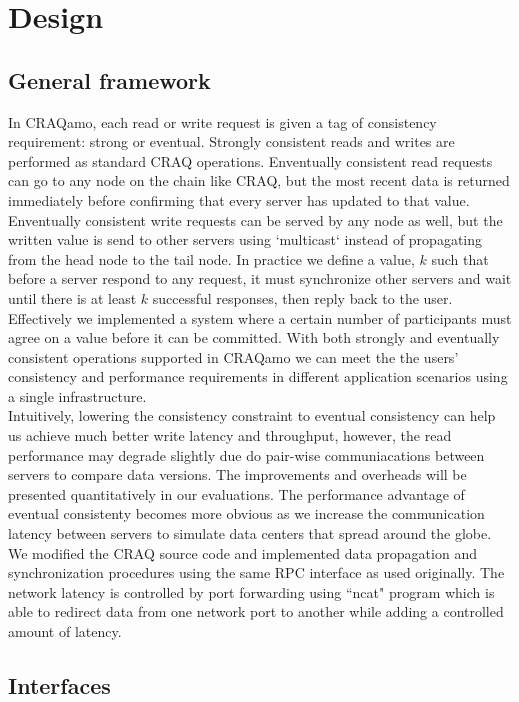 \section{Design}
\label{sec:design}

\subsection{General framework}
In CRAQamo, each read or write request is given a tag of consistency requirement: strong or eventual. Strongly consistent reads and writes are performed as standard CRAQ operations. Enventually consistent read requests can go to any node on the chain like CRAQ, but the most recent data is returned immediately before confirming that every server has updated to that value. Enventually consistent write requests can be served by any node as well, but the written value is send to other servers using `multicast` instead of propagating from the head node to the tail node. In practice we define a value, $k$ such that before a server respond to any request, it must synchronize other servers and wait until there is at least $k$ successful responses, then reply back to the user. Effectively we implemented a system where a certain number of participants must agree on a value before it can be committed. With both strongly and eventually consistent operations supported in CRAQamo we can meet the the users' consistency and performance requirements in different application scenarios using a single infrastructure. \\

Intuitively, lowering the consistency constraint to eventual consistency can help us achieve much better write latency and throughput, however, the read performance may degrade slightly due do pair-wise communiacations between servers to compare data versions. The improvements and overheads will be presented quantitatively in our evaluations. The performance advantage of eventual consistenty becomes more obvious as we increase the communication latency between servers to simulate data centers that spread around the globe. We modified the CRAQ source code and implemented data propagation and synchronization procedures using the same RPC interface as used originally. The network latency is controlled by port forwarding using ``ncat" program which is able to redirect data from one network port to another while adding a controlled amount of latency.

\subsection{Interfaces}

